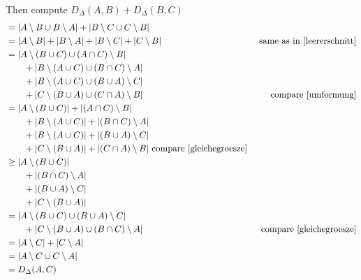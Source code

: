 \documentclass[10pt,a4paper,boxed]{hmcpset}
\begin{document}
\begin{solution}
\begin{enumerate}[(i)]
\begin{description}
							Then compute
							$D_\Delta(A,B) + D_\Delta(B,C)$ 
							\begin{align}
								&= |A \setminus B \cup B \setminus A| + |B \setminus C \cup C \setminus B| \\
								&= |A\setminus B| + | B \setminus A| + | B \setminus C| + |C \setminus B| & \text{ same as in \ref{leererschnitt}}\\
								&= | A \setminus (B \cup C) \cup (A \cap C) \setminus B| 					  \\
								&\qquad + | B \setminus ( A \cup C ) \cup (B \cap C) \setminus A | \\
								&\qquad + | B \setminus (A \cup C)  \cup (B \cup A) \setminus C |  \\
								&\qquad + | C \setminus(B \cup A) \cup (C \cap A) \setminus B|     &\text{ compare \ref{umformung}} \\
								&= | A \setminus (B \cup C)       | + | (A \cap C) \setminus B| 					  \\
								&\qquad + | B \setminus ( A \cup C ) | + | (B \cap C) \setminus A | \\
								&\qquad + | B \setminus (A \cup C)   | + | (B \cup A) \setminus C |  \\
								&\qquad + | C \setminus(B \cup A)    | + | (C \cap A) \setminus B| \text{ compare \ref{gleichegroesze}}\\
								&\geq | A \setminus (B \cup C)       | 					  \\
								&\qquad + | (B \cap C) \setminus A | \\
								&\qquad + | (B \cup A) \setminus C |  \\
								&\qquad + | C \setminus(B \cup A) | \\
								& = | A \setminus (B \cup C) \cup (B \cup A) \setminus C |  \\
								&\qquad + | C \setminus(B \cup A) \cup (B \cap C) \setminus A | & \text{ compare \ref{gleichegroesze}}\\
								& = | A \setminus C | + | C \setminus A| \\
								& = | A \setminus C \cup C \setminus A| \\
								& = D_\Delta(A,C)
							\end{align}


\end{description}
\end{enumerate}
\end{solution}
\end{document}
